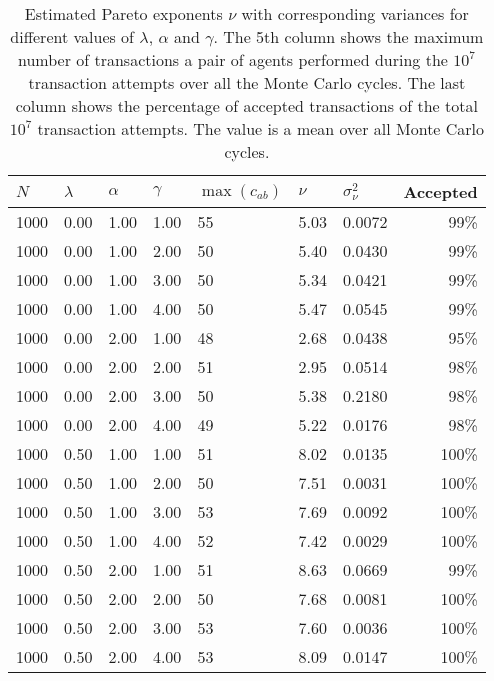 \documentclass{article}
\begin{document}
\begin{table}
\caption{Estimated Pareto exponents $\nu$ with corresponding variances for different values of $\lambda$, $\alpha$ and $\gamma$. The 5th column shows the maximum number of transactions a pair of agents performed during the $10^7$ transaction attempts over all the Monte Carlo cycles. The last column shows the percentage of accepted transactions of the total $10^7$ transaction attempts. The value is a mean over all Monte Carlo cycles.}
\label{tab:history}
\begin{tabularx}{\textwidth}{X X X X X X X r}
\hline
$N$ & $\lambda$ & $\alpha$ & $\gamma$ & $\max(c_{ab})$ & $\nu$ & $\sigma_{\nu}^2$ & Accepted \\
\hline\hline
1000 & 0.00 & 1.00 & 1.00 & 55 & 5.03 & 0.0072 & 99\%\\
1000 & 0.00 & 1.00 & 2.00 & 50 & 5.40 & 0.0430 & 99\%\\
1000 & 0.00 & 1.00 & 3.00 & 50 & 5.34 & 0.0421 & 99\%\\
1000 & 0.00 & 1.00 & 4.00 & 50 & 5.47 & 0.0545 & 99\%\\
1000 & 0.00 & 2.00 & 1.00 & 48 & 2.68 & 0.0438 & 95\%\\
1000 & 0.00 & 2.00 & 2.00 & 51 & 2.95 & 0.0514 & 98\%\\
1000 & 0.00 & 2.00 & 3.00 & 50 & 5.38 & 0.2180 & 98\%\\
1000 & 0.00 & 2.00 & 4.00 & 49 & 5.22 & 0.0176 & 98\%\\
1000 & 0.50 & 1.00 & 1.00 & 51 & 8.02 & 0.0135 & 100\%\\
1000 & 0.50 & 1.00 & 2.00 & 50 & 7.51 & 0.0031 & 100\%\\
1000 & 0.50 & 1.00 & 3.00 & 53 & 7.69 & 0.0092 & 100\%\\
1000 & 0.50 & 1.00 & 4.00 & 52 & 7.42 & 0.0029 & 100\%\\
1000 & 0.50 & 2.00 & 1.00 & 51 & 8.63 & 0.0669 & 99\%\\
1000 & 0.50 & 2.00 & 2.00 & 50 & 7.68 & 0.0081 & 100\%\\
1000 & 0.50 & 2.00 & 3.00 & 53 & 7.60 & 0.0036 & 100\%\\
1000 & 0.50 & 2.00 & 4.00 & 53 & 8.09 & 0.0147 & 100\%\\
\hline
\end{tabularx}
\end{table}
\end{document}
